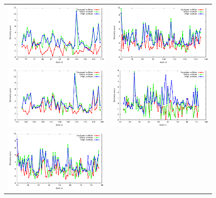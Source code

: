\documentclass[a4paper,12pt]{article}
\begin{document}
   \begin{figure}[t]
     \centering
     \begin{tabular}{cc}
       \includegraphics[width=8.45cm]{images/1ABO_p3_similarity_bypos.pdf} &
       \includegraphics[width=8.45cm]{images/1BM2_p3_similarity_bypos.pdf} \\
       \includegraphics[width=8.45cm]{images/1CKA_p3_similarity_bypos.pdf} &
       \includegraphics[width=8.45cm]{images/1G9O_p3_similarity_bypos.pdf} \\
       \includegraphics[width=8.45cm]{images/1M61_p3_similarity_bypos.pdf} &

\end{tabular}
\end{figure}
\end{document}
